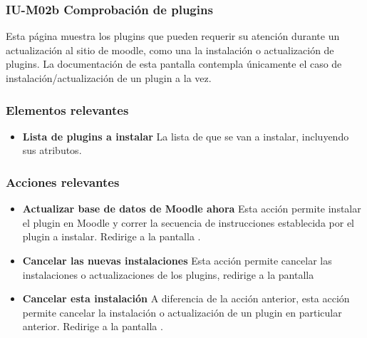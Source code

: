 
\subsubsection{IU-M02b Comprobación de plugins}

 Esta página muestra los plugins que pueden requerir su atención durante un actualización al sitio
 de moodle, como una la instalación o actualización de plugins. La documentación de esta pantalla
 contempla únicamente el caso de instalación/actualización de un plugin a la vez.


\subsubsection{Elementos relevantes}

   \begin{itemize}
   \item {\bf Lista de plugins a instalar}
        La lista de  que se van a instalar, incluyendo
        sus atributos.
   \end{itemize}

\subsubsection{Acciones relevantes}

    \begin{itemize}
    \item {\bf Actualizar base de datos de Moodle ahora}
        Esta acción permite instalar el plugin en Moodle y correr la secuencia de
        instrucciones establecida por el plugin a instalar. Redirige a la pantalla
        .

    \item {\bf Cancelar las nuevas instalaciones}
        Esta acción permite cancelar las instalaciones o actualizaciones de los plugins,
        redirige a la pantalla 

    \item {\bf Cancelar esta instalación}
        A diferencia de la acción anterior, esta acción permite cancelar la instalación
        o actualización de un plugin en particular anterior. Redirige a la pantalla
        .
    \end{itemize}

\clearpage
